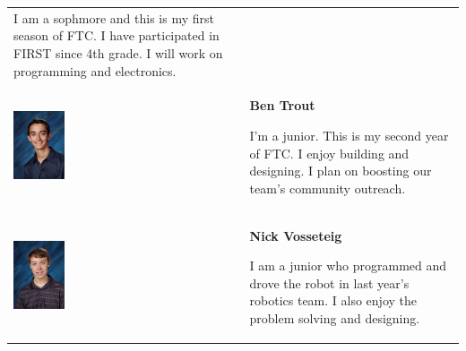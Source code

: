 \begin{tabular}{p{2cm}b{8cm}}
 \medskip 

 I am a sophmore and this is my first season of FTC. I have participated in FIRST since 4th grade. I will work on programming and electronics.\\
 
 \includegraphics[height=2cm,keepaspectratio=true]{./TeamSection/TroutBen.jpg}&

 \textbf{Ben Trout}
 
 \medskip
 
 I'm a junior. This is my second year of FTC. I enjoy building and designing. I plan on boosting our team's community outreach. \\
 
 \includegraphics[height=2cm,keepaspectratio=true]{./TeamSection/VosseteigNick.jpg}&

 \textbf{Nick Vosseteig}
 
 \medskip
 
 I am a junior who programmed and drove the robot in last year's robotics team. I also enjoy the problem solving and designing.\\
\end{tabular} 
